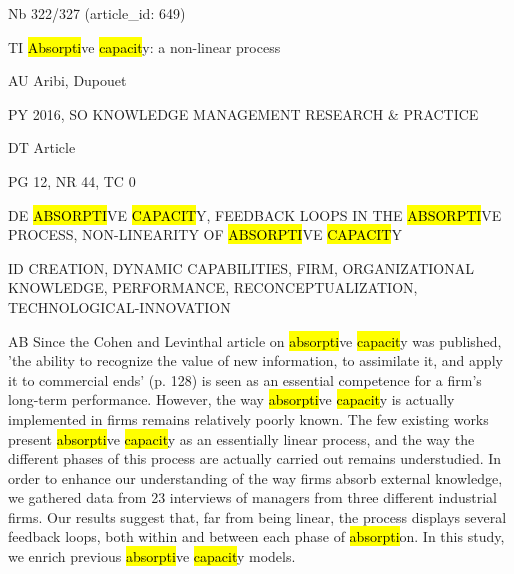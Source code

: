 \documentclass[a4paper]{article}
\begin{document}
\vspace*{-2cm}
Nb \tabto{0cm}322/327 (article\_id: 649)\par
TI \tabto{0cm}\hl{Absorpti}ve \hl{capacit}y: a non-linear process\par
AU \tabto{0cm}Aribi, Dupouet\par
PY \tabto{0cm}2016, SO KNOWLEDGE MANAGEMENT RESEARCH \& PRACTICE\par
DT \tabto{0cm}Article\par
PG \tabto{0cm}12, NR 44, TC 0\par
DE \tabto{0cm}\hl{ABSORPTI}VE \hl{CAPACIT}Y, FEEDBACK LOOPS IN THE \hl{ABSORPTI}VE PROCESS, NON-LINEARITY OF \hl{ABSORPTI}VE \hl{CAPACIT}Y\par
ID \tabto{0cm}CREATION, DYNAMIC CAPABILITIES, FIRM, ORGANIZATIONAL KNOWLEDGE, PERFORMANCE, RECONCEPTUALIZATION, TECHNOLOGICAL-INNOVATION\par
AB \tabto{0cm}Since the Cohen and Levinthal article on \hl{absorpti}ve \hl{capacit}y was published, 'the ability to recognize the value of new information, to assimilate it, and apply it to commercial ends' (p. 128) is seen as an essential competence for a firm's long-term performance. However, the way \hl{absorpti}ve \hl{capacit}y is actually implemented in firms remains relatively poorly known. The few existing works present \hl{absorpti}ve \hl{capacit}y as an essentially linear process, and the way the different phases of this process are actually carried out remains understudied. In order to enhance our understanding of the way firms absorb external knowledge, we gathered data from 23 interviews of managers from three different industrial firms. Our results suggest that, far from being linear, the process displays several feedback loops, both within and between each phase of \hl{absorpti}on. In this study, we enrich previous \hl{absorpti}ve \hl{capacit}y models.\par
\clearpage
\end{document}
